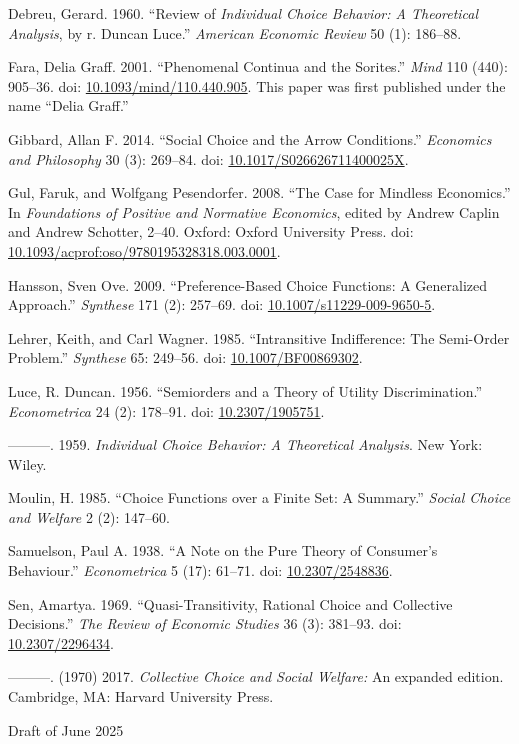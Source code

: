 \documentclass[
  11pt,
  letterpaper,
  DIV=11,
  numbers=noendperiod,
  twoside]{scrartcl}
\newlength{\cslhangindent}
\newenvironment{CSLReferences}[2] %
 {\begin{list}{}{%
  \setlength{\itemindent}{0pt}
  \setlength{\leftmargin}{0pt}
  \setlength{\parsep}{0pt}
  \ifodd #1
   \setlength{\leftmargin}{\cslhangindent}
   \setlength{\itemindent}{-1\cslhangindent}
  \fi
  \setlength{\itemsep}{#2\baselineskip}}}
 {\end{list}}
\begin{document}
\begin{CSLReferences}{1}{0}
Debreu, Gerard. 1960. {``Review of \emph{Individual Choice Behavior: A
Theoretical Analysis}, by r. Duncan Luce.''} \emph{American Economic
Review} 50 (1): 186--88.

Fara, Delia Graff. 2001. {``Phenomenal Continua and the Sorites.''}
\emph{Mind} 110 (440): 905--36. doi:
\href{https://doi.org/10.1093/mind/110.440.905}{10.1093/mind/110.440.905}.
This paper was first published under the name {``Delia Graff.''}

Gibbard, Allan F. 2014. {``Social Choice and the Arrow Conditions.''}
\emph{Economics and Philosophy} 30 (3): 269--84. doi:
\href{https://doi.org/10.1017/S026626711400025X}{10.1017/S026626711400025X}.

Gul, Faruk, and Wolfgang Pesendorfer. 2008. {``The Case for Mindless
Economics.''} In \emph{Foundations of Positive and Normative Economics},
edited by Andrew Caplin and Andrew Schotter, 2--40. Oxford: Oxford
University Press. doi:
\href{https://doi.org/10.1093/acprof:oso/9780195328318.003.0001}{10.1093/acprof:oso/9780195328318.003.0001}.

Hansson, Sven Ove. 2009. {``Preference-Based Choice Functions: A
Generalized Approach.''} \emph{Synthese} 171 (2): 257--69. doi:
\href{https://doi.org/10.1007/s11229-009-9650-5}{10.1007/s11229-009-9650-5}.

Lehrer, Keith, and Carl Wagner. 1985. {``Intransitive Indifference: The
Semi-Order Problem.''} \emph{Synthese} 65: 249--56. doi:
\href{https://doi.org/10.1007/BF00869302}{10.1007/BF00869302}.

Luce, R. Duncan. 1956. {``Semiorders and a Theory of Utility
Discrimination.''} \emph{Econometrica} 24 (2): 178--91. doi:
\href{https://doi.org/10.2307/1905751}{10.2307/1905751}.

---------. 1959. \emph{Individual Choice Behavior: A Theoretical
Analysis}. New York: Wiley.

Moulin, H. 1985. {``Choice Functions over a Finite Set: A Summary.''}
\emph{Social Choice and Welfare} 2 (2): 147--60.

Samuelson, Paul A. 1938. {``A Note on the Pure Theory of Consumer's
Behaviour.''} \emph{Econometrica} 5 (17): 61--71. doi:
\href{https://doi.org/10.2307/2548836}{10.2307/2548836}.

Sen, Amartya. 1969. {``Quasi-Transitivity, Rational Choice and
Collective Decisions.''} \emph{The Review of Economic Studies} 36 (3):
381--93. doi: \href{https://doi.org/10.2307/2296434}{10.2307/2296434}.

---------. (1970) 2017. \emph{Collective Choice and Social Welfare:} An
expanded edition. Cambridge, MA: Harvard University Press.

\end{CSLReferences}



\noindent Draft of June 2025
\end{document}

